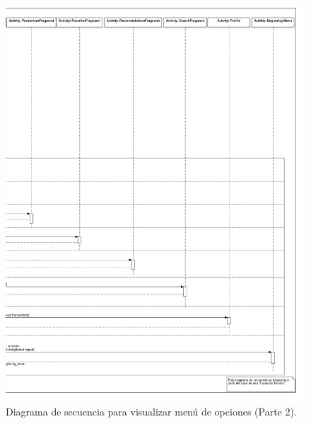 \FloatBarrier
\begin{figure}[htbp!]
		\centering
			\includegraphics[width=1 \textwidth]{imagenes/Diagramas_UserApp/Nuevos_diagramas/visualizarMenu2}
		\caption{Diagrama de secuencia para visualizar menú de opciones (Parte 2).}
		\label{image:DSVisualizarMenu3}
\end{figure}
\FloatBarrier

